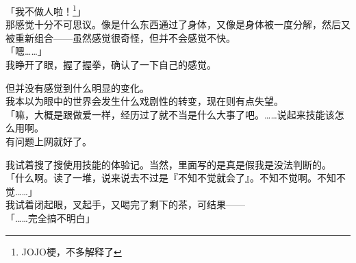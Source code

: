 「我不做人啦！\footnote{JOJO梗，不多解释了}」\\

那感觉十分不可思议。像是什么东西通过了身体，又像是身体被一度分解，然后又被重新组合——虽然感觉很奇怪，但并不会感觉不快。\\

「嗯……」\\

我睁开了眼，握了握拳，确认了一下自己的感觉。

但并没有感觉到什么明显的变化。\\

我本以为眼中的世界会发生什么戏剧性的转变，现在则有点失望。\\

「嘛，大概是跟做爱一样，经历过了就不当是什么大事了吧。……说起来技能该怎么用啊。\\

有问题上网就好了。

我试着搜了搜使用技能的体验记。当然，里面写的是真是假我是没法判断的。\\

「什么啊。读了一堆，说来说去不过是『不知不觉就会了』。不知不觉啊。不知不觉……」\\

我试着闭起眼，叉起手，又喝完了剩下的茶，可结果——\\

「……完全搞不明白」\\

